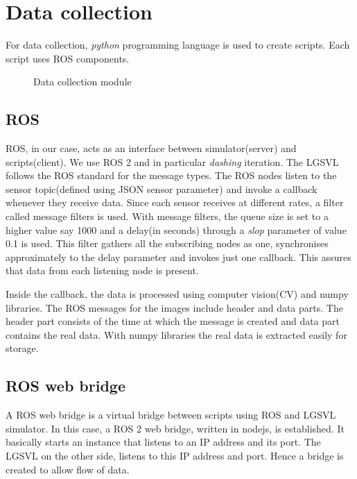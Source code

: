 \section{Data collection}
For data collection, \textit{python} programming language is used to create scripts. Each
script uses ROS components.

\begin{figure}
	\centering
    \def\svgwidth{\textwidth}
    \caption{Data collection module}
    \label{fig:datacollectionmodule}
\end{figure}

\subsection{ROS}
ROS, in our case, acts as an interface between simulator(server) and scripts(client).
We use ROS 2 and in particular \textit{dashing} iteration. The LGSVL follows the ROS standard for the message types.
The ROS nodes listen to the sensor topic(defined using JSON sensor parameter) and invoke
a callback whenever they receive data. Since each sensor receives at different rates, a
filter called message filters is used. With message filters, the queue size is set to a
higher value say 1000 and a delay(in seconds) through a \textit{slop} parameter of value
0.1 is used. This filter gathers all the subscribing nodes as one, synchronises
approximately to the delay parameter and invokes just one callback. This assures that data
from each listening node is present.

Inside the callback, the data is processed using computer vision(CV) and numpy libraries.
The ROS messages for the images include header and data
parts. The header part consists of the time at which the message is created and data part
contains the real data. With numpy libraries the real data is extracted easily for storage.

\subsection{ROS web bridge}
A ROS web bridge is a virtual bridge between scripts using ROS and LGSVL simulator. In this
case, a ROS 2 web bridge, written in nodejs, is established. It basically starts an instance
that listens to an IP address and its port. The LGSVL on the other side, listens to this
IP address and port. Hence a bridge is created to allow flow of data.


